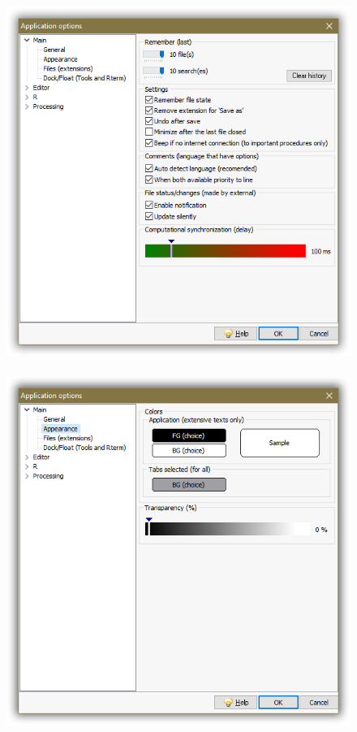 \begin{figure}[H]
  \includegraphics[scale=0.35]{./res/app_main_general.png}~~
  \includegraphics[scale=0.35]{./res/app_main_appearance.png}\\

\end{figure}

